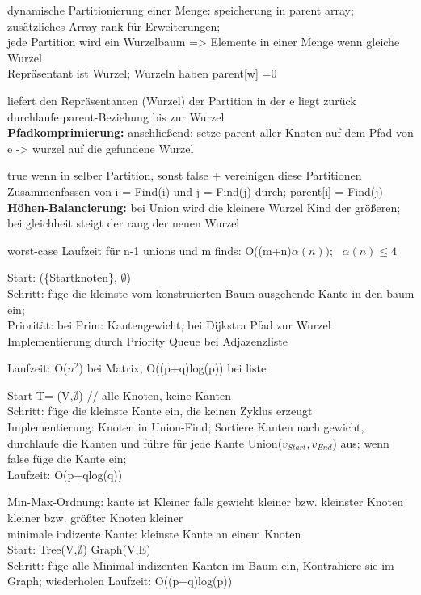 dynamische Partitionierung einer Menge: speicherung in parent array; zusätzliches Array rank für Erweiterungen;\\
jede Partition wird ein Wurzelbaum => Elemente in einer Menge wenn gleiche Wurzel\\
Repräsentant ist Wurzel; Wurzeln haben parent[w] =0

liefert den Repräsentanten (Wurzel) der Partition in der e liegt zurück\\
durchlaufe parent-Beziehung bis zur Wurzel\\
\textbf{Pfadkomprimierung:} anschließend: setze parent aller Knoten auf dem Pfad von e -> wurzel auf die gefundene Wurzel

true wenn in selber Partition, sonst false + vereinigen diese Partitionen\\
Zusammenfassen von i = Find(i) und j = Find(j) durch; parent[i] = Find(j)\\
\textbf{Höhen-Balancierung:}  bei Union wird die kleinere Wurzel Kind der größeren; bei gleichheit steigt der rang der neuen Wurzel

worst-case Laufzeit für n-1 unions und m finds: O((m+n)$\alpha(n));~~~ \alpha(n) \leq 4$

Start: (\{Startknoten\}, $\emptyset$)\\
Schritt: füge die kleinste vom konstruierten Baum ausgehende Kante in den baum ein;\\
Priorität: bei Prim: Kantengewicht, bei Dijkstra Pfad zur Wurzel\\
Implementierung durch Priority Queue bei Adjazenzliste

Laufzeit: O($n^2$) bei Matrix, O((p+q)log(p)) bei liste

Start T= (V,$\emptyset$) // alle Knoten, keine Kanten\\
Schritt: füge die kleinste Kante ein, die keinen Zyklus erzeugt\\
Implementierung: Knoten in Union-Find; Sortiere Kanten nach gewicht, durchlaufe die Kanten und führe für jede Kante Union($v_{Start},v_{End}$) aus; wenn false füge die Kante ein;\\
Laufzeit: O(p+qlog(q))

Min-Max-Ordnung: kante ist Kleiner falls gewicht kleiner bzw. kleinster Knoten kleiner bzw. größter Knoten kleiner\\
minimale indizente Kante: kleinste Kante an einem Knoten\\
Start: Tree(V,$\emptyset$) Graph(V,E)\\
Schritt: füge alle Minimal indizenten Kanten im Baum ein, Kontrahiere sie im Graph; wiederholen
Laufzeit: O((p+q)log(p))

